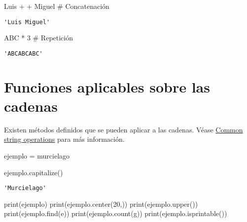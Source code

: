 \documentclass[
  letterpaper,
  DIV=11,
  numbers=noendperiod]{scrreprt}
\newenvironment{Shaded}{\begin{snugshade}}{\end{snugshade}}
\newcommand{\BuiltInTok}[1]{\textcolor[rgb]{0.00,0.23,0.31}{#1}}
\newcommand{\CommentTok}[1]{\textcolor[rgb]{0.37,0.37,0.37}{#1}}
\newcommand{\DecValTok}[1]{\textcolor[rgb]{0.68,0.00,0.00}{#1}}
\newcommand{\NormalTok}[1]{\textcolor[rgb]{0.00,0.23,0.31}{#1}}
\newcommand{\OperatorTok}[1]{\textcolor[rgb]{0.37,0.37,0.37}{#1}}
\newcommand{\StringTok}[1]{\textcolor[rgb]{0.13,0.47,0.30}{#1}}
\begin{document}
\begin{Shaded}
\begin{Highlighting}[]
\CommentTok{\textquotesingle{}Luis\textquotesingle{}} \OperatorTok{+} \StringTok{\textquotesingle{} \textquotesingle{}} \OperatorTok{+} \StringTok{\textquotesingle{}Miguel\textquotesingle{}} \CommentTok{\# Concatenación}
\end{Highlighting}
\end{Shaded}

\begin{verbatim}
'Luis Miguel'
\end{verbatim}

\begin{Shaded}
\begin{Highlighting}[]
\CommentTok{\textquotesingle{}ABC\textquotesingle{}} \OperatorTok{*} \DecValTok{3} \CommentTok{\# Repetición}
\end{Highlighting}
\end{Shaded}

\begin{verbatim}
'ABCABCABC'
\end{verbatim}

\section{Funciones aplicables sobre las
cadenas}\label{funciones-aplicables-sobre-las-cadenas}

Existen métodos definidos que se pueden aplicar a las cadenas. Véase
\href{https://docs.python.org/3/library/string.html}{Common string
operations} para más información.

\begin{Shaded}
\begin{Highlighting}[]
\NormalTok{ejemplo }\OperatorTok{=} \StringTok{\textquotesingle{}murcielago\textquotesingle{}}
\end{Highlighting}
\end{Shaded}

\begin{Shaded}
\begin{Highlighting}[]
\NormalTok{ejemplo.capitalize()}
\end{Highlighting}
\end{Shaded}

\begin{verbatim}
'Murcielago'
\end{verbatim}

\begin{Shaded}
\begin{Highlighting}[]
\BuiltInTok{print}\NormalTok{(ejemplo)}
\BuiltInTok{print}\NormalTok{(ejemplo.center(}\DecValTok{20}\NormalTok{,}\StringTok{\textquotesingle{}{-}\textquotesingle{}}\NormalTok{))}
\BuiltInTok{print}\NormalTok{(ejemplo.upper())}
\BuiltInTok{print}\NormalTok{(ejemplo.find(}\StringTok{\textquotesingle{}e\textquotesingle{}}\NormalTok{))}
\BuiltInTok{print}\NormalTok{(ejemplo.count(}\StringTok{\textquotesingle{}g\textquotesingle{}}\NormalTok{))}
\BuiltInTok{print}\NormalTok{(ejemplo.isprintable())}
\end{Highlighting}
\end{Shaded}
\end{document}
